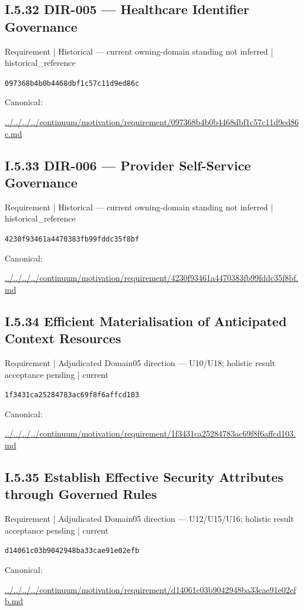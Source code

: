 \documentclass[10pt,a4paper]{article}
\begin{document}
\subsection*{I.5.32 DIR-005 — Healthcare Identifier Governance}
\label{element-097368b4b0b4468dbf1c57c11d9ed86c}
{\small Requirement | Historical — current owning-domain standing not inferred | historical\_reference}\par
\texttt{097368b4b0b4468dbf1c57c11d9ed86c}\par
Canonical: \par
{\footnotesize\url{../../../../continuum/motivation/requirement/097368b4b0b4468dbf1c57c11d9ed86c.md}}\par
\subsection*{I.5.33 DIR-006 — Provider Self-Service Governance}
\label{element-4230f93461a4470383fb99fddc35f8bf}
{\small Requirement | Historical — current owning-domain standing not inferred | historical\_reference}\par
\texttt{4230f93461a4470383fb99fddc35f8bf}\par
Canonical: \par
{\footnotesize\url{../../../../continuum/motivation/requirement/4230f93461a4470383fb99fddc35f8bf.md}}\par
\subsection*{I.5.34 Efficient Materialisation of Anticipated Context Resources}
\label{element-1f3431ca25284783ac69f8f6affcd103}
{\small Requirement | Adjudicated Domain05 direction — U10/U18; holistic result acceptance pending | current}\par
\texttt{1f3431ca25284783ac69f8f6affcd103}\par
Canonical: \par
{\footnotesize\url{../../../../continuum/motivation/requirement/1f3431ca25284783ac69f8f6affcd103.md}}\par
\subsection*{I.5.35 Establish Effective Security Attributes through Governed Rules}
\label{element-d14061c03b9042948ba33cae91e02efb}
{\small Requirement | Adjudicated Domain05 direction — U12/U15/U16; holistic result acceptance pending | current}\par
\texttt{d14061c03b9042948ba33cae91e02efb}\par
Canonical: \par
{\footnotesize\url{../../../../continuum/motivation/requirement/d14061c03b9042948ba33cae91e02efb.md}}\par
\end{document}
